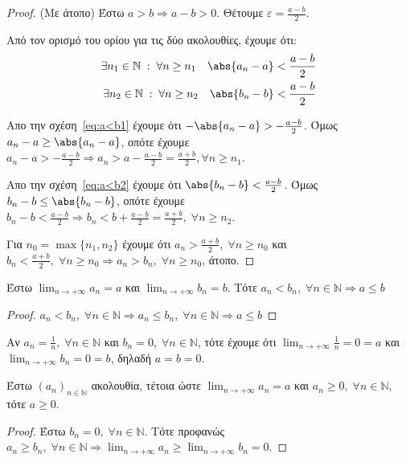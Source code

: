 \documentclass[main.tex]{subfiles}
\begin{document}
\begin{proof}(Με άτοπο)
    Έστω $ a>b \Rightarrow a-b>0 $. Θέτουμε $ \varepsilon = \frac{a-b}{2} $.

   Από τον ορισμό του ορίου για τις δύο ακολουθίες, έχουμε ότι:
\begin{align}
    \exists n_{1} \in \mathbb{N} \; : \; \forall n \geq n_{1} \quad \abs{a_{n}-a} < \frac{a-b}{2} 
    \label{eq:a<b1} \\
    \exists n_{2} \in \mathbb{N} \; : \; \forall n \geq n_{2} \quad \abs{b_{n}-b} < \frac{a-b}{2}
    \label{eq:a<b2} \\
\end{align}

Απο την σχέση~\eqref{eq:a<b1} έχουμε ότι $ - \abs{a_{n}-a} > - \frac{a-b}{2} $. Όμως $ a_{n}- a \geq 
\abs{a_{n}-a} $, οπότε έχουμε $ a_{n}- a > - \frac{a-b}{2} \Rightarrow a_{n} > a -
\frac{a-b}{2} = \frac{a+b}{2}, \forall n \geq n_{1} $.

Απο την σχέση~\eqref{eq:a<b2} έχουμε ότι $  \abs{b_{n}-b} <  \frac{a-b}{2} $. Όμως $ b_{n}- b \leq 
\abs{b_{n}-b} $, οπότε έχουμε $ b_{n}- b <  \frac{a-b}{2} \Rightarrow b_{n} <  b +
\frac{a-b}{2} = \frac{a+b}{2}, \; \forall n \geq n_{2}  $.

Για $ n_{0} = \max \{ n_{1}, n_{2} \} $ έχουμε ότι $ a_{n} > \frac{a+b}{2}, \; \forall n \geq n_{0}$
και $ b_{n} < \frac{a+b}{2}, \; \forall n \geq n_{0} \Rightarrow a_{n} > b_{n}, \; \forall n 
\geq n_{0} $, άτοπο.

\end{proof}


\begin{prop}
    Έστω $ \lim_{n \to +\infty} a_{n} = a $ και $ \lim_{n \to +\infty} b_{n} = b $. Τότε
    $
        a_{n} < b_{n}, \; \forall n \in \mathbb{N} \Rightarrow a \leq b
     $ 
\end{prop}

\begin{proof}
    $ a_{n}< b_{n}, \; \forall n \in \mathbb{N} \Rightarrow a_{n} \leq b_{n}, \; \forall n \in
    \mathbb{N} \Rightarrow a \leq b $
\end{proof}

\begin{rem}
\item {}
    Αν $ a_{n}= \frac{1}{n}, \; \forall n \in \mathbb{N} $ και $ b_{n}=0, \; \forall n \in
    \mathbb{N} $, τότε έχουμε ότι $ \lim_{n \to +\infty} \frac{1}{n} = 0 = a $ και $ \lim_{n \to
    +\infty} b_{n} = 0 = b $, δηλαδή $ a=b=0  $.
\end{rem}

\begin{cor}
    Έστω $ (a_{n})_{n \in \mathbb{N}} $ ακολουθία, τέτοια ώστε $ \lim_{n \to +\infty} a_{n} = a$ 
    και $ a_{n} \geq 0, \; \forall n \in \mathbb{N} $, τότε $ a \geq 0 $.
\end{cor}

\begin{proof}
    Έστω $ b_{n} = 0, \; \forall n \in \mathbb{N} $. Τότε προφανώς $ a_{n} \geq b_{n}, \; \forall n
    \in \mathbb{N} \Rightarrow \lim_{n \to +\infty} a_{n} \geq \lim_{n \to +\infty} b_{n} = 0$.
\end{proof}
\end{document}
